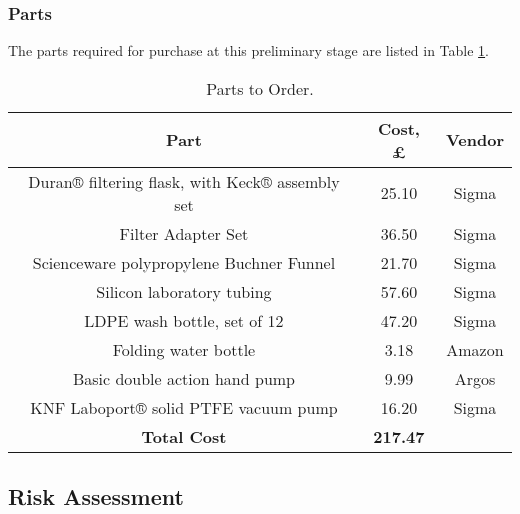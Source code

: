 \documentclass[12pt]{article}
\begin{document}
\subsubsection{Parts}

The parts required for purchase at this preliminary stage are listed in Table \ref{tab:partsorder}.
\begin{table}[!h]
\centering
\begin{tabular}{|c|c|c|}
\hline
\textbf{Part}                                   & \textbf{Cost, \pounds} & \textbf{Vendor} \\ \hline
Duran® filtering flask, with Keck® assembly set & 25.10                                & Sigma           \\ \hline
Filter Adapter Set                              & 36.50                                & Sigma           \\ \hline
Scienceware polypropylene Buchner Funnel        & 21.70                                & Sigma           \\ \hline
Silicon laboratory tubing                       & 57.60                                & Sigma           \\ \hline
LDPE wash bottle, set of 12                     & 47.20                                & Sigma           \\ \hline
Folding water bottle                            & 3.18                                 & Amazon          \\ \hline
Basic double action hand pump                   & 9.99                                 & Argos           \\ \hline
KNF Laboport® solid PTFE vacuum pump            & 16.20                                & Sigma           \\ \hline
\textbf{Total Cost}                             & \textbf{217.47}                      & \textbf{}       \\ \hline
\end{tabular}
\caption{\label{tab:partsorder}Parts to Order.}
\end{table}

\subsection{Risk Assessment}
\end{document}
